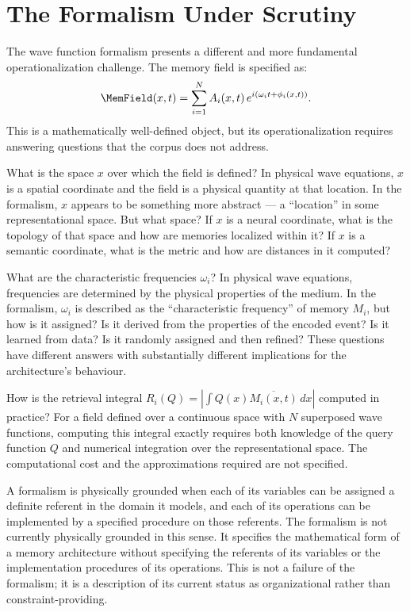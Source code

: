 \section{The \MEMeight{} Formalism Under Scrutiny}
\label{sec:mem8-scrutiny}

The \MEMeight{} wave function formalism presents a different
and more fundamental operationalization challenge. The memory
field is specified as:
\[
  \MemField(x,t) = \sum_{i=1}^{N} A_i(x,t)\,
  e^{i(\omega_i t + \phi_i(x,t))}.
\]
This is a mathematically well-defined object, but its
operationalization requires answering questions that the
corpus does not address.

What is the space $x$ over which the field is defined?
In physical wave equations, $x$ is a spatial coordinate
and the field is a physical quantity at that location.
In the \MEMeight{} formalism, $x$ appears to be something
more abstract --- a ``location'' in some representational
space. But what space? If $x$ is a neural coordinate,
what is the topology of that space and how are memories
localized within it? If $x$ is a semantic coordinate,
what is the metric and how are distances in it computed?

What are the characteristic frequencies $\omega_i$? In
physical wave equations, frequencies are determined by
the physical properties of the medium. In the \MEMeight{}
formalism, $\omega_i$ is described as the ``characteristic
frequency'' of memory $M_i$, but how is it assigned?
Is it derived from the properties of the encoded event?
Is it learned from data? Is it randomly assigned and
then refined? These questions have different answers with
substantially different implications for the architecture's
behaviour.

How is the retrieval integral $R_i(Q) = |\int Q(x)
\overline{M_i(x,t)}\,dx|$ computed in practice?
For a field defined over a continuous space with $N$
superposed wave functions, computing this integral
exactly requires both knowledge of the query function
$Q$ and numerical integration over the representational
space. The computational cost and the approximations
required are not specified.

\begin{auditprop}
\label{ap:formalism-grounding}
A formalism is physically grounded when each of its
variables can be assigned a definite referent in the
domain it models, and each of its operations can be
implemented by a specified procedure on those referents.
The \MEMeight{} formalism is not currently physically
grounded in this sense. It specifies the mathematical
form of a memory architecture without specifying the
referents of its variables or the implementation
procedures of its operations. This is not a failure
of the formalism; it is a description of its current
status as organizational rather than constraint-providing.
\end{auditprop}

